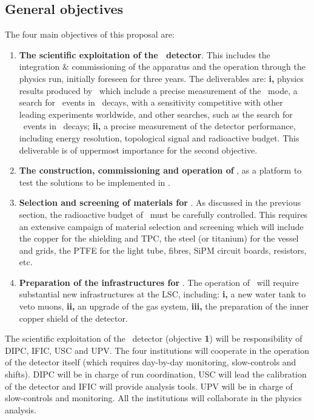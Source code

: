 
\subsection*{General objectives}

The four main objectives of this proposal are:
\begin{enumerate}
\item {\bf The scientific exploitation of the \Next\ detector}. This includes the integration \& commissioning of the apparatus and the operation through the physics run, initially foreseen for three years. The deliverables are: {\bf i,} physics results produced by \Next\ which include a precise measurement of the \bbtnu\ mode, a search for \bbonu\ events in \XE\ decays, with a sensitivity competitive with other leading experiments worldwide, and other searches, such as the search for \bbonu\ events in \XEX\ decays; {\bf ii,} a precise measurement of the detector performance, including energy resolution, topological signal and radioactive budget. This deliverable is of uppermost importance for the second objective. 
\item {\bf The construction, commissioning and operation of \HDEMO}, as a platform to test the solutions to be implemented in \NHD.  
\item {\bf Selection and screening of materials for \NHD}. As discussed in the previous section, the radioactive budget of \NHD\ must be carefully controlled. This requires an extensive campaign of material selection and screening which will include the copper for the shielding and TPC, the steel (or titanium) for the vessel and grids, the PTFE for the light tube, fibres, SiPM circuit boards, resistors, etc. 
\item {\bf Preparation of the infrastructures for \NHD}. The operation of \NHD\ will require substantial new infrastructures at the LSC, including: {\bf i,} a new water tank to veto muons, {\bf ii,} an upgrade of the gas system, {\bf iii,} the preparation of the inner copper shield of the detector. 
\end{enumerate}

\indent

The scientific exploitation of the \Next\ detector (objective {\bf 1}) will be responsibility of DIPC, IFIC,  USC and UPV. The four institutions will cooperate in the operation of the detector itself (which requires day-by-day monitoring, slow-controls and shifts). DIPC will be in charge of run coordination, USC will lead the calibration of the detector and IFIC will provide analysis tools. UPV will be in charge of slow-controls and monitoring. All the institutions will collaborate in the physics analysis.  

